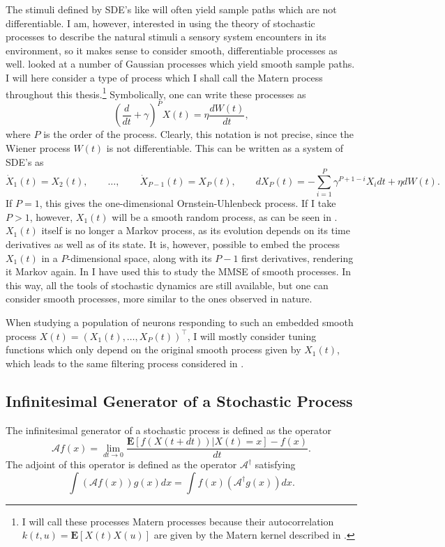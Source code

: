 {The stimuli defined by SDE's like  will often yield sample paths which are not differentiable. I am, however, interested in using the theory of stochastic processes
to describe the natural stimuli a sensory system encounters in its environment, so it makes sense to consider smooth, differentiable processes as well.  looked at
a number of Gaussian processes which yield smooth sample paths. I will here consider a type of process which I shall call the Matern process throughout this thesis.\footnote{I will call 
these processes Matern processes because their autocorrelation $k(t,u) = \boldsymbol{E}[X(t)X(u)]$ are given by the Matern kernel described in .} Symbolically, 
one can write these processes as
\[
\left(\frac{d}{dt} + \gamma\right)^P X(t) = \eta \frac{dW(t)}{dt},
\]
where $P$ is the order of the process. Clearly, this notation is not precise, since the Wiener process $W(t)$ is not differentiable. This can be written as a system of SDE's as
\[
\dot{X}_1(t) = X_2(t),\qquad \ldots, \qquad\dot{X}_{P-1}(t) = X_{P}(t),\qquad  dX_{P}(t) =- \sum_{i=1}^{P} \gamma^{P+1-i} X_i dt + \eta dW(t).
\]
If $P=1$, this gives the one-dimensional Ornstein-Uhlenbeck process. If I take $P>1$, however, $X_1(t)$ will be a smooth random process, as can be seen in
. $X_1(t)$ itself is no longer a Markov process, as its evolution depends on its time derivatives as well as of its state. It is, however, possible to embed the
process $X_1(t)$ in a $P$-dimensional space, along with its $P-1$ first derivatives, rendering it Markov again. In  I have used this to study the MMSE of smooth
processes. In this way, all the tools of stochastic dynamics are still available, but one can consider smooth processes, more similar to the ones observed in nature.\par

When studying a population of neurons responding to such an embedded smooth process ${X}(t) = \left(X_1(t),\ldots, X_{P}(t)\right)^\top$, I will mostly consider tuning
functions which only depend on the original smooth process given by $X_1(t)$, which leads to the same filtering process considered in .

\subsection{Infinitesimal Generator of a Stochastic Process}

The infinitesimal generator of a stochastic process is defined as the operator
\[
\mathcal{A} f(x) = \lim_{dt\to 0} \frac{\boldsymbol{E}\left[f(X(t+dt))|X(t)=x\right] -f(x)}{dt}.
\]
The adjoint of this operator is defined as the operator $\mathcal{A}^\dagger$ satisfying
\[
\int (\mathcal{A} f(x)) g(x) dx = \int f(x) (\mathcal{A}^\dagger g(x)) dx.
\]

}
